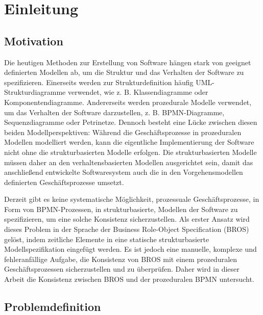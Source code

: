 \chapter{Einleitung}
\label{chap:introduction}

\section{Motivation}

Die heutigen Methoden zur Erstellung von Software hängen stark von geeignet definierten Modellen ab, um die Struktur und das Verhalten der Software zu spezifizieren.
Einerseits werden zur Strukturdefinition häufig UML-Strukturdiagramme verwendet, wie z. B. Klassendiagramme oder Komponentendiagramme.
Andererseits werden prozedurale Modelle verwendet, um das Verhalten der Software darzustellen, z. B. BPMN-Diagramme, Sequenzdiagramme oder Petrinetze.
Dennoch besteht eine Lücke zwischen diesen beiden Modellperspektiven: Während die Geschäftsprozesse in prozeduralen Modellen modelliert werden, kann die eigentliche Implementierung der Software nicht ohne die strukturbasierten Modelle erfolgen.
Die strukturbasierten Modelle müssen daher an den verhaltensbasierten Modellen ausgerichtet sein, damit das anschließend entwickelte Softwaresystem auch die in den Vorgehensmodellen definierten Geschäftsprozesse umsetzt.

Derzeit gibt es keine systematische Möglichkeit, prozessuale Geschäftsprozesse, in Form von BPMN-Prozessen, in strukturbasierte, Modellen der Software zu spezifizieren, um eine solche Konsistenz sicherzustellen.
Als erster Ansatz wird dieses Problem in der Sprache der Business Role-Object Specification (BROS) gelöst, indem zeitliche Elemente in eine statische strukturbasierte Modellspezifikation eingefügt werden.
Es ist jedoch eine manuelle, komplexe und fehleranfällige Aufgabe, die Konsistenz von BROS mit einem prozeduralen Geschäftsprozessen sicherzustellen und zu überprüfen.
Daher wird in dieser Arbeit die Konsistenz zwischen BROS und der prozeduralen BPMN untersucht.

\section{Problemdefinition}

